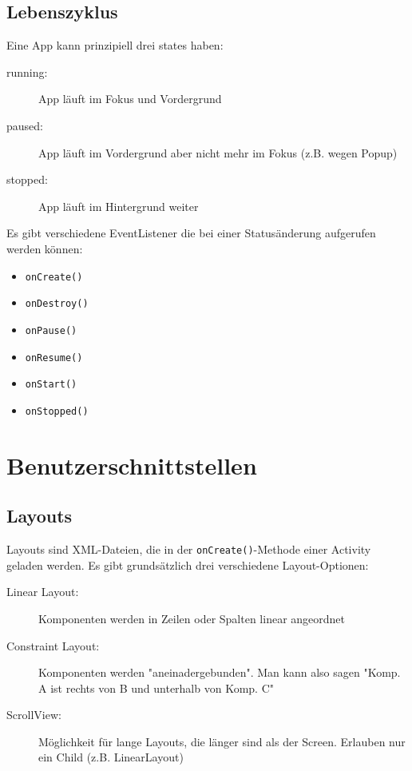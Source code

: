 \documentclass[a4paper, 11pt]{article}
\newcommand{\code}[1]{\texttt{#1}}
\begin{document}
\subsection{Lebenszyklus}
Eine App kann prinzipiell drei states haben:

\begin{description}
	\item[running: ] App läuft im Fokus und Vordergrund
	\item[paused: ] App läuft im Vordergrund aber nicht mehr im Fokus (z.B. wegen Popup)
	\item[stopped: ] App läuft im Hintergrund weiter
\end{description}

Es gibt verschiedene EventListener die bei einer Statusänderung aufgerufen werden können:

\begin{multicols}{3}
	\begin{itemize}
		\item \code{onCreate()}
		\item \code{onDestroy()}
	\columnbreak
		\item \code{onPause()}
		\item \code{onResume()}
	\columnbreak
		\item \code{onStart()}
		\item \code{onStopped()}
	\end{itemize}
\end{multicols}

\section{Benutzerschnittstellen}
\subsection{Layouts}
Layouts sind XML-Dateien, die in der \code{onCreate()}-Methode einer Activity geladen werden. Es gibt grundsätzlich drei verschiedene Layout-Optionen:

\begin{description}
	\item[Linear Layout: ] Komponenten werden in Zeilen oder Spalten linear angeordnet
	\item[Constraint Layout: ] Komponenten werden "aneinadergebunden". Man kann also sagen "Komp. A ist rechts von B und unterhalb von Komp. C"
	\item[ScrollView: ] Möglichkeit für lange Layouts, die länger sind als der Screen. Erlauben nur ein Child (z.B. LinearLayout)
\end{description}
\vspace{10px}
\end{document}
